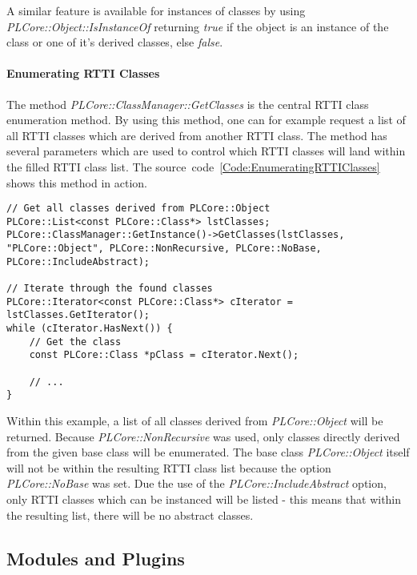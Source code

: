 A similar feature is available for instances of classes by using \emph{PLCore::Object::IsInstanceOf} returning \emph{true} if the object is an instance of the class or one of it's derived classes, else \emph{false}.


\paragraph{Enumerating \ac{RTTI} Classes}
The method \emph{PLCore::ClassManager::GetClasses} is the central \ac{RTTI} class enumeration method. By using this method, one can for example request a list of all \ac{RTTI} classes which are derived from another \ac{RTTI} class. The method has several parameters which are used to control which \ac{RTTI} classes will land within the filled \ac{RTTI} class list. The source~code~\ref{Code:EnumeratingRTTIClasses} shows this method in action.
\begin{lstlisting}[float=htb,label=Code:EnumeratingRTTIClasses,caption={Enumerating \ac{RTTI} classes}]
// Get all classes derived from PLCore::Object
PLCore::List<const PLCore::Class*> lstClasses;
PLCore::ClassManager::GetInstance()->GetClasses(lstClasses, "PLCore::Object", PLCore::NonRecursive, PLCore::NoBase, PLCore::IncludeAbstract);

// Iterate through the found classes
PLCore::Iterator<const PLCore::Class*> cIterator = lstClasses.GetIterator();
while (cIterator.HasNext()) {
	// Get the class
	const PLCore::Class *pClass = cIterator.Next();

	// ...
}
\end{lstlisting}
Within this example, a list of all classes derived from \emph{PLCore::Object} will be returned. Because \emph{PLCore::NonRecursive} was used, only classes directly derived from the given base class will be enumerated. The base class \emph{PLCore::Object} itself will not be within the resulting \ac{RTTI} class list because the option \emph{PLCore::NoBase} was set. Due the use of the \emph{PLCore::IncludeAbstract} option, only \ac{RTTI} classes which can be instanced will be listed - this means that within the resulting list, there will be no abstract classes.




\subsection{Modules and Plugins}
